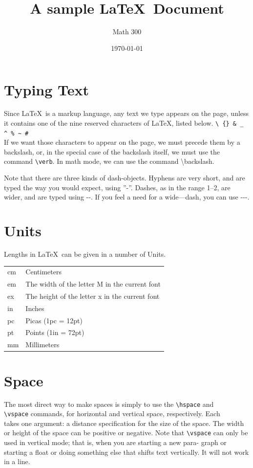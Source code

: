 \documentclass[12pt,A4]{article}
\title{A sample \LaTeX \ Document}
\author{Math 300}
\date{\today}
\begin{document}
	\begin{titlepage}
		\maketitle
		\section{Typing Text}
		Since \LaTeX \ is a markup language, any text we type appears on the page,
		unless it contains one of the nine reserved characters of \LaTeX , listed below. 
		\texttt{\textbackslash \  \{\} \& \_ \^{} \% \~{} \#} \\
		If we want those characters to appear on the page, we must precede them by
		a backslash, or, in the special case of the backslash itself, we must use the
		command \texttt{\textbackslash verb}. In math mode, we can use the command \textbackslash backslash. 
		
			Note that there are three kinds of dash-objects. Hyphens are very short,
		and are typed the way you would expect, using ”-”. Dashes, as in the range
		1--2, are wider, and are typed using -{}-. If you feel a need for a wide—dash,
		you can use -{}-{}-.
		
		\section{Units}
		Lengths in \LaTeX \ can be given in a number of Units. \\
		\begin{tabular}{l l}
			cm & Centimeters \\
			em & The width of the letter M in the current font \\
			ex & The height of the letter x in the current font \\
			in & Inches \\
			pc & Picas (1pc = 12pt) \\
			pt & Points (1in = 72pt) \\
			mm & Millimeters \\
		\end{tabular}	
	\end{titlepage}
	\section{Space}
	The most direct way to make spaces is simply to use the \texttt{\textbackslash hspace} and \\
	\texttt{\textbackslash vspace} commands, for horizontal and vertical space, respectively. Each \\
	takes one argument: a distance specification for the size of the space. The
	width or height of the space can be positive or negative. Note that \texttt{\textbackslash vspace} can only be used in vertical mode; that is, when you are starting a new para-
	graph or starting a float or doing something else that shifts text vertically.
	It will not work in a line.
	
\end{document}
